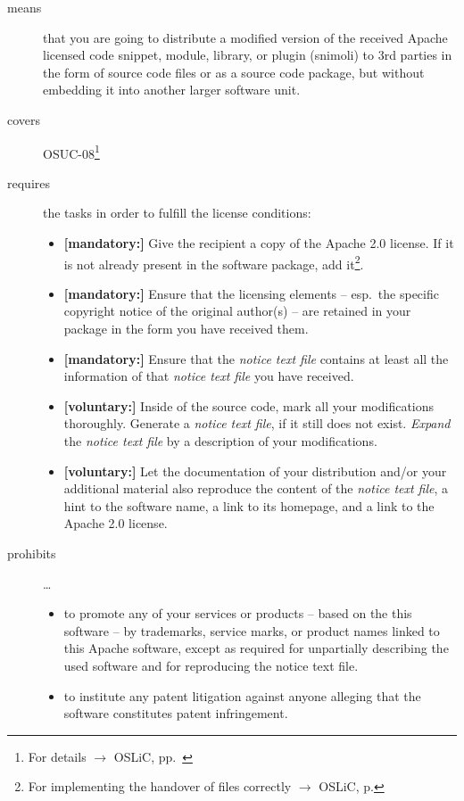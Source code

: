 \begin{description}
\item[means] that you are going to distribute a modified version of the received
Apache licensed code snippet, module, library, or plugin (snimoli) to 3rd
parties in the form of source code files or as a source code package, but
without embedding it into another larger software unit.
\item[covers] OSUC-08\footnote{For details $\rightarrow$ OSLiC, pp.\ \pageref{OSUC-08-DEF}}
\item[requires] the tasks in order to fulfill the license conditions:
\begin{itemize}
  
  \item \textbf{[mandatory:]} Give the recipient a copy of the Apache 2.0
  license. If it is not already present in the software package, add
  it\footnote{For implementing the handover of files correctly $\rightarrow$
  OSLiC, p. \pageref{DistributingFilesHint}}.

  \item \textbf{[mandatory:]} Ensure that the licensing elements -- esp.\ the
  specific copyright notice of the original author(s) -- are retained in your
  package in the form you have received them.
  
  \item \textbf{[mandatory:]} Ensure that the \emph{notice text file} contains
  at least all the information of that \emph{notice text file} you have
  received.
 
  \item \textbf{[voluntary:]} Inside of the source code, mark all your
  modifications thoroughly. Generate a \emph{notice text file}, if it still does
  not exist. \emph{Expand} the \emph{notice text file} by a description of your
  modifications.
   
  \item \textbf{[voluntary:]} Let the documentation of your distribution and/or
  your additional material also reproduce the content of the \emph{notice text
  file}, a hint to the software name, a link to its homepage, and a link to the
  Apache 2.0 license.

\end{itemize}

\item[prohibits] \ldots
\begin{itemize}
  \item to promote any of your services or products – based on the this software
  – by trademarks, service marks, or product names linked to this Apache
  software, except as required for unpartially describing the used software and
  for reproducing the notice text file.
  \item to institute any patent litigation against anyone alleging that the
  software constitutes patent infringement.
\end{itemize}

\end{description}


